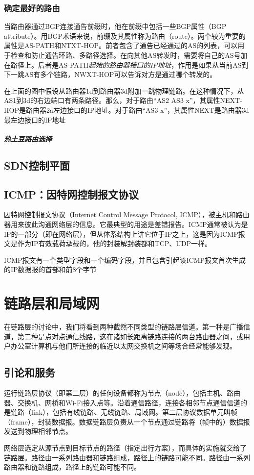 \documentclass[]{report}
\begin{document}
		\subsection{确定最好的路由}
		当路由器通过BGP连接通告前缀时，他在前缀中包括一些BGP属性（BGP attribute）。用BGP术语来说，前缀及其属性称为路由（route）。两个较为重要的属性是AS-PATH和NTXT-HOP。前者包含了通告已经通过的AS的列表，可以用于检查和防止通告环路、多路径选择。在向其他AS转发时，需要将自己的AS号加在路径上。后者是AS-PATH\textit{起始的路由器接口的IP地址}，作用是如果从当前AS到下一跳AS有多个链路，NWXT-HOP可以告诉对方是通过哪个转发的。\par
		在上面的图中假设从路由器1d到路由器3d附加一跳物理链路。在这种情况下，从AS1到3d的右边端口有两条路径。那么，对于路由“AS2 AS3 x”，其属性NEXT-HOP是路由器2a左边接口的IP地址。对于路由“AS3 x”，其属性NEXT是路由器3d最左边接口的IP地址
		\paragraph{热土豆路由选择}
	\section{SDN控制平面}
	\section{ICMP：因特网控制报文协议}
	因特网控制报文协议（Internet Control Message Protocol, ICMP），被主机和路由器用来彼此沟通网络层的信息。它最典型的用途是差错报告。ICMP通常被认为是IP的一部分（即在网络层），但从体系结构上讲它位于IP之上，这是因为ICMP报文是作为IP有效载荷承载的，他的封装解封装都和TCP、UDP一样。\par
	ICMP报文有一个类型字段和一个编码字段，并且包含引起该ICMP报文首次生成的IP数据报的首部和前8个字节

	\chapter{链路层和局域网}
	在链路层的讨论中，我们将看到两种截然不同类型的链路层信道。第一种是广播信道，第二种是点对点通信线路，这在诸如长距离链路连接的两台路由器之间，或用户办公室计算机与他们所连接的临近以太网交换机之间等场合经常能够发现。
	\section{引论和服务}
	运行链路层协议（即第二层）的任何设备都称为节点（node），包括主机、路由器、交换机、网桥和Wi-Fi接入点等。沿着通信路径，连接各相邻节点通信信道的是链路（link），包括有线链路、无线链路、局域网。第二层协议数据单元叫帧（frame），封装数据报。数据链路层负责从一个节点通过链路将（帧中的）数据报发送到物理相邻节点。\par
	网络层选定从源节点到目标节点的路径（指定出行方案），而具体的实施就交给了链路层。路径由一系列路由器和链路组成，路径上的链路可能不同。路径由一系列路由器和链路组成，路径上的链路可能不同。
\end{document}
